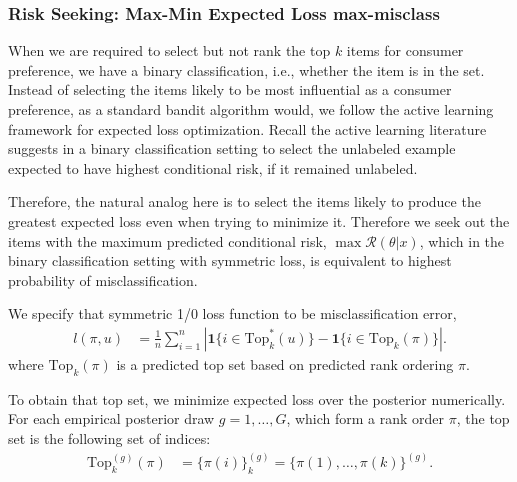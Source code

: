 \documentclass[nonblindrev]{informs3}
\newcommand{\mismin}{\textbf{max-misclass}}
\newcommand{\topset}{\text{Top}_k}
\newcommand{\risk}{\mathcal{R}}
\begin{document}
\subsubsection{Risk Seeking: Max-Min Expected Loss \mismin}

When we are required to select but not rank the top $k$ items for consumer preference, we have a binary classification, i.e., whether the item is in the set. Instead of selecting the items likely to be most influential as a consumer preference, as a standard bandit algorithm would, we follow the active learning framework for expected loss optimization. Recall the active learning literature suggests in a binary classification setting to select the unlabeled example expected to have highest conditional risk, if it remained unlabeled. 

Therefore, the natural analog here is to select the items likely to produce the greatest expected loss even when trying to minimize it. Therefore we seek out the items with the maximum predicted conditional risk, $\max \risk(\theta|x)$, which in the binary classification setting with symmetric loss, is equivalent to highest probability of misclassification. 

We specify that symmetric 1/0 loss function to be misclassification error,
\begin{align}
l(\pi,u) &= \frac{1}{n} \sum_{i=1}^{n} \left| \mathbf{1}\{ i \in \topset^{*}(u) \}-\mathbf{1}\{ i \in \topset(\pi) \} \right|.
\end{align}
where $\topset(\pi)$ is a predicted top set based on predicted rank ordering $\pi$. 

To obtain that top set, we minimize expected loss over the posterior numerically. For each empirical posterior draw $g=1,\ldots,G$, which form a rank order $\pi$, the top set is the following set of indices:
\begin{align}
\topset^{(g)}(\pi) &= \{ \pi(i) \}_k^{(g)} = \{ \pi(1),\ldots,\pi(k) \}^{(g)}.
\end{align}
\end{document}
